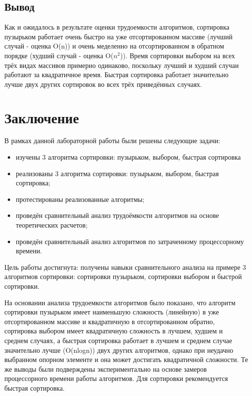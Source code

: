 \documentclass{report}
\begin{document}
\section{Вывод}

Как и ожидалось в результате оценки трудоемкости алгоритмов, сортировка пузырьком работает очень быстро на уже отсортированном массиве (лучший случай - оценка O(n)) и очень меделенно на отсортированном в обратном порядке (худший случай - оценка O($n^2$)). Время сортировки выбором на всех трёх видах массивов примерно одинаково, поскольку лучший и худший случаи работают за квадратичное время. Быстрая сортировка работает значительно лучше двух других сортировок во всех трёх приведённых случаях.


\chapter*{Заключение}

В рамках данной лабораторной работы были решены следующие задачи:

\begin{itemize}
	\item изучены 3 алгоритма сортировки: пузырьком, выбором, быстрая сортировка
	\item реализованы 3 алгоритма сортировки: пузырьком, выбором, быстрая сортировка;
	\item протестированы реализованные алгоритмы;
	\item проведён сравнительный анализ трудоёмкости алгоритмов на основе теоретических расчетов;
	\item проведён сравнительный анализ алгоритмов по затраченному процессорному времени.
\end{itemize}
Цель работы достигнута: получены навыки сравнительного анализа на примере 3 алгоритмов сортировки: сортировки пузырьком, сортировки выбором и быстрой сортировки. 

На основании анализа трудоемкости алгоритмов было показано, что алгоритм сортировки пузырьком имеет наименьшую сложность (линейную) в уже отсортированном массиве и квадратичную в отсортированном обратно, сортировка выбором имеет квадратичную сложность в лучшем, худшем и среднем случаях, а быстрая сортировка работает в лучшем и среднем случае значительно лучше (O(nlogn)) двух других алгоритмов, однако при неудачно выбранном опорном элементе и она может достигать квадратичной сложности. Те же выводы были подверждены экспериментально на основе замеров процессорного времени работы алгоритмов. 
Для сортировки рекомендуется быстрая сортировка.
\end{document}
